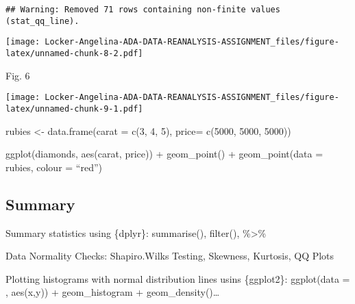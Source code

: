 \documentclass[]{article}
\newenvironment{Shaded}{\begin{snugshade}}{\end{snugshade}}
\newcommand{\KeywordTok}[1]{\textcolor[rgb]{0.13,0.29,0.53}{\textbf{#1}}}
\newcommand{\DataTypeTok}[1]{\textcolor[rgb]{0.13,0.29,0.53}{#1}}
\newcommand{\StringTok}[1]{\textcolor[rgb]{0.31,0.60,0.02}{#1}}
\newcommand{\CommentTok}[1]{\textcolor[rgb]{0.56,0.35,0.01}{\textit{#1}}}
\newcommand{\OtherTok}[1]{\textcolor[rgb]{0.56,0.35,0.01}{#1}}
\newcommand{\OperatorTok}[1]{\textcolor[rgb]{0.81,0.36,0.00}{\textbf{#1}}}
\newcommand{\NormalTok}[1]{#1}
\begin{document}
\begin{verbatim}
## Warning: Removed 71 rows containing non-finite values (stat_qq_line).
\end{verbatim}

\texttt{[image: Locker-Angelina-ADA-DATA-REANALYSIS-ASSIGNMENT\_files/figure-latex/unnamed-chunk-8-2.pdf]}

Fig. 6

\begin{Shaded}
\end{Shaded}

\texttt{[image: Locker-Angelina-ADA-DATA-REANALYSIS-ASSIGNMENT\_files/figure-latex/unnamed-chunk-9-1.pdf]}

rubies \textless{}- data.frame(carat = c(3, 4, 5), price= c(5000, 5000,
5000))

ggplot(diamonds, aes(carat, price)) + geom\_point() + geom\_point(data =
rubies, colour = ``red'')

\subsection{Summary}\label{summary}

Summary statistics using \{dplyr\}: summarise(), filter(),
\%\textgreater{}\%

Data Normality Checks: Shapiro.Wilks Testing, Skewness, Kurtosis, QQ
Plots

Plotting histograms with normal distribution lines usins \{ggplot2\}:
ggplot(data = , aes(x,y)) + geom\_histogram + geom\_density()\ldots{}
\end{document}
